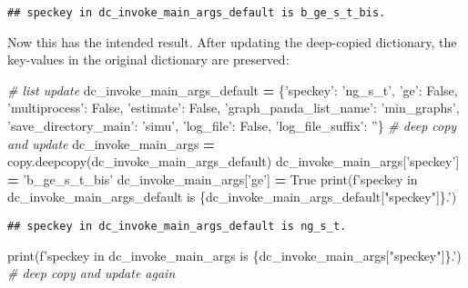 \documentclass[
]{book}
\newenvironment{Shaded}{\begin{snugshade}}{\end{snugshade}}
\newcommand{\BuiltInTok}[1]{#1}
\newcommand{\CommentTok}[1]{\textcolor[rgb]{0.56,0.35,0.01}{\textit{#1}}}
\newcommand{\NormalTok}[1]{#1}
\newcommand{\OperatorTok}[1]{\textcolor[rgb]{0.81,0.36,0.00}{\textbf{#1}}}
\newcommand{\SpecialCharTok}[1]{\textcolor[rgb]{0.00,0.00,0.00}{#1}}
\newcommand{\SpecialStringTok}[1]{\textcolor[rgb]{0.31,0.60,0.02}{#1}}
\newcommand{\StringTok}[1]{\textcolor[rgb]{0.31,0.60,0.02}{#1}}
\newcommand{\VariableTok}[1]{\textcolor[rgb]{0.00,0.00,0.00}{#1}}
\begin{document}
\begin{verbatim}
## speckey in dc_invoke_main_args_default is b_ge_s_t_bis.
\end{verbatim}

Now this has the intended result. After updating the deep-copied dictionary, the key-values in the original dictionary are preserved:

\begin{Shaded}
\begin{Highlighting}[]
\CommentTok{# list update}
\NormalTok{dc_invoke_main_args_default }\OperatorTok{=}\NormalTok{ \{}\StringTok{'speckey'}\NormalTok{: }\StringTok{'ng_s_t'}\NormalTok{,}
                               \StringTok{'ge'}\NormalTok{: }\VariableTok{False}\NormalTok{,}
                               \StringTok{'multiprocess'}\NormalTok{: }\VariableTok{False}\NormalTok{,}
                               \StringTok{'estimate'}\NormalTok{: }\VariableTok{False}\NormalTok{,}
                               \StringTok{'graph_panda_list_name'}\NormalTok{: }\StringTok{'min_graphs'}\NormalTok{,}
                               \StringTok{'save_directory_main'}\NormalTok{: }\StringTok{'simu'}\NormalTok{,}
                               \StringTok{'log_file'}\NormalTok{: }\VariableTok{False}\NormalTok{,}
                               \StringTok{'log_file_suffix'}\NormalTok{: }\StringTok{''}\NormalTok{\}}
\CommentTok{# deep copy and update}
\NormalTok{dc_invoke_main_args }\OperatorTok{=}\NormalTok{ copy.deepcopy(dc_invoke_main_args_default)}
\NormalTok{dc_invoke_main_args[}\StringTok{'speckey'}\NormalTok{] }\OperatorTok{=} \StringTok{'b_ge_s_t_bis'}
\NormalTok{dc_invoke_main_args[}\StringTok{'ge'}\NormalTok{] }\OperatorTok{=} \VariableTok{True}
\BuiltInTok{print}\NormalTok{(}\SpecialStringTok{f'speckey in dc_invoke_main_args_default is }\SpecialCharTok{\{}\NormalTok{dc_invoke_main_args_default[}\StringTok{"speckey"}\NormalTok{]}\SpecialCharTok{\}}\SpecialStringTok{.'}\NormalTok{)}
\end{Highlighting}
\end{Shaded}

\begin{verbatim}
## speckey in dc_invoke_main_args_default is ng_s_t.
\end{verbatim}

\begin{Shaded}
\begin{Highlighting}[]
\BuiltInTok{print}\NormalTok{(}\SpecialStringTok{f'speckey in dc_invoke_main_args is }\SpecialCharTok{\{}\NormalTok{dc_invoke_main_args[}\StringTok{"speckey"}\NormalTok{]}\SpecialCharTok{\}}\SpecialStringTok{.'}\NormalTok{)}
\CommentTok{# deep copy and update again}
\end{Highlighting}
\end{Shaded}
\end{document}
